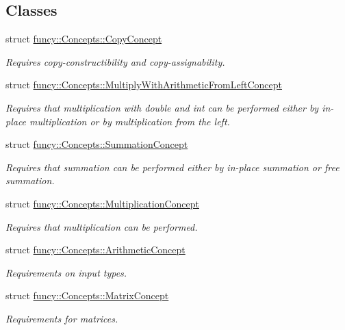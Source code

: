 \subsection*{Classes}
\begin{DoxyCompactItemize}
\item 
struct \hyperlink{structfuncy_1_1Concepts_1_1CopyConcept}{funcy\-::\-Concepts\-::\-Copy\-Concept}
\begin{DoxyCompactList}\small\item\em Requires copy-\/constructibility and copy-\/assignability. \end{DoxyCompactList}\item 
struct \hyperlink{structfuncy_1_1Concepts_1_1MultiplyWithArithmeticFromLeftConcept}{funcy\-::\-Concepts\-::\-Multiply\-With\-Arithmetic\-From\-Left\-Concept}
\begin{DoxyCompactList}\small\item\em Requires that multiplication with double and int can be performed either by in-\/place multiplication or by multiplication from the left. \end{DoxyCompactList}\item 
struct \hyperlink{structfuncy_1_1Concepts_1_1SummationConcept}{funcy\-::\-Concepts\-::\-Summation\-Concept}
\begin{DoxyCompactList}\small\item\em Requires that summation can be performed either by in-\/place summation or free summation. \end{DoxyCompactList}\item 
struct \hyperlink{structfuncy_1_1Concepts_1_1MultiplicationConcept}{funcy\-::\-Concepts\-::\-Multiplication\-Concept}
\begin{DoxyCompactList}\small\item\em Requires that multiplication can be performed. \end{DoxyCompactList}\item 
struct \hyperlink{structfuncy_1_1Concepts_1_1ArithmeticConcept}{funcy\-::\-Concepts\-::\-Arithmetic\-Concept}
\begin{DoxyCompactList}\small\item\em Requirements on input types. \end{DoxyCompactList}\item 
struct \hyperlink{structfuncy_1_1Concepts_1_1MatrixConcept}{funcy\-::\-Concepts\-::\-Matrix\-Concept}
\begin{DoxyCompactList}\small\item\em Requirements for matrices. \end{DoxyCompactList}\item 

\end{DoxyCompactItemize}
